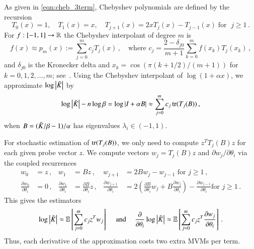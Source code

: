 As given in \cref{eqn:cheb_3term}, Chebyshev polynomials are defined by the
recursion
\begin{equation}\label{eqn:chebrecursion}
  T_0(x) = 1, \quad T_1(x) = x, \quad T_{j+1}(x) = 2xT_j(x)-T_{j-1}(x)\; \text{
  for }\; j\geq 1\,.
\end{equation}
For $f : [-1,1] \to \mathbb{R}$ the Chebyshev interpolant of degree $m$ is
\begin{equation}\label{eqn:chebinterp}
  f(x) \approx p_m(x) := \sum_{j=0}^m c_j T_j(x)\,, \quad \mbox{where } c_j = 
  \frac{2 - \delta_{j0}}{m+1} \displaystyle\sum_{k=0}^m f(x_k)T_j(x_k)\,,
\end{equation}
and $\delta_{j0}$ is the Kronecker delta and $x_k = \cos(\pi(k+1/2)/(m+1))$
for $k=0,1,2,\ldots,m$; see~\cite{gil2007numerical}. Using the Chebyshev
interpolant of $\log(1+\alpha x)$, we approximate $\log\left\lvert\tilde{K}_{}\right\rvert$ by
\begin{equation}\label{eqn:sdescale}
  \log\left\lvert\tilde{K}_{}\right\rvert -n\log\beta = \log\left\lvert I+\alpha B\right\rvert \approx \sum_{j=0}^m
  c_j\operatorname{tr}(T_j(B))\,,
\end{equation}
when $B=(\tilde{K}_{}/\beta-1)/\alpha$ has eigenvalues $\lambda_i \in (-1,1)$.

For stochastic estimation of $\operatorname{tr}(T_j(B))$, we only need to compute $z^T T_j
(B)z$ for each given probe vector $z$. We compute vectors $w_j=T_j(B)z$ and
$\partial w_j/\partial \theta_i$ via the coupled recurrences
\begin{align}
  w_0 &= z\,, &
  w_1 &= Bz\,, &
  w_{j+1} &= 2Bw_j - w_{j-1} \mbox{ for } j \geq 1\,, \label{eqn:chebrec_w} \\
  \frac{\partial w_0}{\partial \theta_i} &= 0\,, &
  \frac{\partial w_1}{\partial \theta_i} &= \frac{\partial B}{\partial \theta_i}
  z\,, &
  \frac{\partial w_{j+1}}{\partial \theta_i} &=
  2\left(\frac{\partial B}{\partial \theta_i} w_j + B \frac{\partial w_j}
  {\partial \theta_i}\right) - \frac{\partial w_{j-1}}{\partial \theta_i} \mbox{
  for } j \geq 1\,.\label{eqn:chebrec_dw}
\end{align}
This gives the estimators
\begin{equation}\label{eqn:logdetexp}
  \log \left\lvert\tilde K\right\rvert \approx \operatorname{\mathbb{E}}\left[\sum_{j=0}^m c_j z^Tw_j\right] \quad 
  \mbox{
  and } \quad \frac{\partial}{\partial \theta_i} \log\left\lvert\tilde K\right\rvert \approx 
  \operatorname{\mathbb{E}}\left[\sum_{j=0}^m c_j z^T\frac{\partial w_j}{\partial \theta_i}\right]\,.
\end{equation}
Thus, each derivative of the approximation costs two extra MVMs per term.

